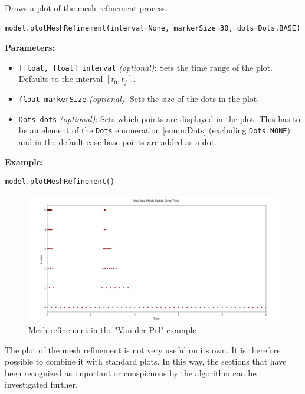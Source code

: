 \documentclass[12pt]{article}
\begin{document}
\begin{mdframed}[backgroundcolor=gray!10, roundcorner=10pt,
		linewidth=1pt]

	Draws a plot of the mesh refinement process.

	\begin{lstlisting}
model.plotMeshRefinement(interval=None, markerSize=30, dots=Dots.BASE)
		\end{lstlisting}
	\label{plotMeshRefinement}
	\textbf{Parameters:}
	\begin{itemize}
		\item \texttt{[float, float] interval} \emph{(optional)}: Sets
		      the time range of the plot. Defaults to the interval $[t_0, t_f]$.

		\item \texttt{float markerSize} \emph{(optional)}: Sets the
		      size of the dots in the plot.

		\item \texttt{Dots dots} \emph{(optional)}: Sets which points
		      are displayed in the plot. This has to be an element of the \texttt{Dots}
		      enumeration \eqref{enum:Dots} (excluding \texttt{Dots.NONE}) and in the default
		      case base points are added as a dot.
	\end{itemize}

	\textbf{Example:}
	\begin{lstlisting}
model.plotMeshRefinement()
\end{lstlisting}
	\begin{figure}[H]
		\centering
		\includegraphics[width=1\textwidth]{images/refinementVDP.png}
		\caption{Mesh refinement in the "Van der Pol" example}
		\label{fig:vdp}
	\end{figure}
\end{mdframed}

The plot of the mesh refinement is not very useful on its own. It is therefore
possible to combine it with standard plots. In this way, the sections that have
been recognized as important or conspicuous by the  algorithm can be
investigated further.
\end{document}
